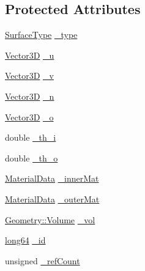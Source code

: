\subsection*{Protected Attributes}
\begin{DoxyCompactItemize}
\item 
\hyperlink{class_d_d_surfaces_1_1_surface_type}{SurfaceType} \hyperlink{class_d_d4hep_1_1_d_d_rec_1_1_vol_surface_base_a7a377fec84bd131b42eb0fb672585850}{\_\-type}
\item 
\hyperlink{class_d_d_surfaces_1_1_vector3_d}{Vector3D} \hyperlink{class_d_d4hep_1_1_d_d_rec_1_1_vol_surface_base_a15a2648f8b9ead47a28826e4ad0cc6c7}{\_\-u}
\item 
\hyperlink{class_d_d_surfaces_1_1_vector3_d}{Vector3D} \hyperlink{class_d_d4hep_1_1_d_d_rec_1_1_vol_surface_base_afc7d4d47e7fa6c7a8c87a52e15177bdb}{\_\-v}
\item 
\hyperlink{class_d_d_surfaces_1_1_vector3_d}{Vector3D} \hyperlink{class_d_d4hep_1_1_d_d_rec_1_1_vol_surface_base_a9371dc34ec00ff652bc4e0ae1423364c}{\_\-n}
\item 
\hyperlink{class_d_d_surfaces_1_1_vector3_d}{Vector3D} \hyperlink{class_d_d4hep_1_1_d_d_rec_1_1_vol_surface_base_a2a59cf024e571ecddb719beadca6aa5e}{\_\-o}
\item 
double \hyperlink{class_d_d4hep_1_1_d_d_rec_1_1_vol_surface_base_a50793721953f298992a3c98f3b77053d}{\_\-th\_\-i}
\item 
double \hyperlink{class_d_d4hep_1_1_d_d_rec_1_1_vol_surface_base_ab60dbb9ad72a790cbfa119edaa225e36}{\_\-th\_\-o}
\item 
\hyperlink{class_d_d4hep_1_1_d_d_rec_1_1_material_data}{MaterialData} \hyperlink{class_d_d4hep_1_1_d_d_rec_1_1_vol_surface_base_abfa00728ddc6fc977fb9d297038448c2}{\_\-innerMat}
\item 
\hyperlink{class_d_d4hep_1_1_d_d_rec_1_1_material_data}{MaterialData} \hyperlink{class_d_d4hep_1_1_d_d_rec_1_1_vol_surface_base_a3745bfba5f2d3b296e4f628c399faa39}{\_\-outerMat}
\item 
\hyperlink{class_d_d4hep_1_1_geometry_1_1_volume}{Geometry::Volume} \hyperlink{class_d_d4hep_1_1_d_d_rec_1_1_vol_surface_base_afbd867fb78d3da533b12850d152005c2}{\_\-vol}
\item 
\hyperlink{namespace_d_d4hep_ac2a70e722b33dc7ddaa20db8954ac836}{long64} \hyperlink{class_d_d4hep_1_1_d_d_rec_1_1_vol_surface_base_ab8b2a71397c0d4c0be2683aabb4e7882}{\_\-id}
\item 
unsigned \hyperlink{class_d_d4hep_1_1_d_d_rec_1_1_vol_surface_base_a89b8556764cf2684ba0f96dfdd6a674e}{\_\-refCount}
\end{DoxyCompactItemize}
